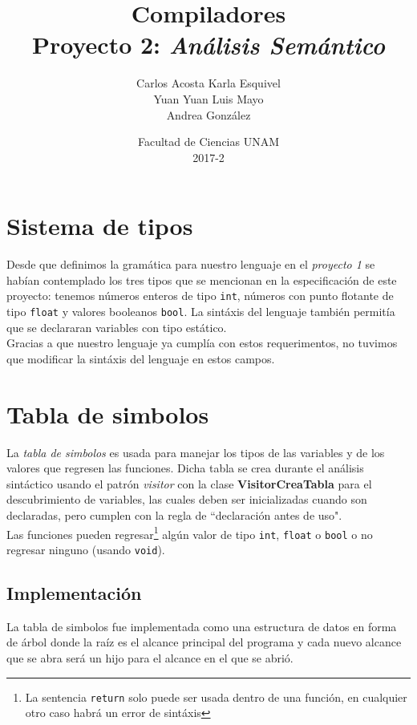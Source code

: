 \documentclass[12pt]{article}
\title{Compiladores\\ Proyecto 2: \emph{Análisis Semántico}}
\author{Carlos Acosta \qquad Karla Esquivel \\ Yuan Yuan \qquad Luis Mayo \\ Andrea González}
\date{Facultad de Ciencias UNAM \\ 2017-2}
\begin{document}
\maketitle
\tableofcontents
\newpage

\section{Sistema de tipos}
Desde que definimos la gramática para nuestro lenguaje en el \emph{proyecto 1} se habían contemplado los tres tipos que se mencionan en la especificación de este proyecto: tenemos números enteros de tipo \texttt{int}, números con punto flotante de tipo \texttt{float} y valores booleanos \texttt{bool}.
La sintáxis del lenguaje también permitía que se declararan variables con tipo estático. \\
Gracias a que nuestro lenguaje ya cumplía con estos requerimentos, no tuvimos que modificar la sintáxis del lenguaje en estos campos.

\section{Tabla de simbolos}
La \textit{tabla de simbolos} es usada para manejar los tipos de las variables y de los valores que regresen las funciones. Dicha tabla se crea durante el análisis sintáctico usando el patrón \textit{visitor} con la clase \textbf{VisitorCreaTabla} para el descubrimiento de variables, las cuales deben ser inicializadas cuando son declaradas, pero cumplen con la regla de ``declaración antes de uso". \\
Las funciones pueden regresar\footnote{La sentencia \texttt{return} solo puede ser usada dentro de una función, en cualquier otro caso habrá un error de sintáxis} algún valor de tipo \texttt{int}, \texttt{float} o \texttt{bool} o no regresar ninguno (usando \texttt{void}).
\subsection{Implementación}
La tabla de simbolos fue implementada como una estructura de datos en forma de árbol donde la raíz es el alcance principal del programa y cada nuevo alcance que se abra será un hijo para el alcance en el que se abrió.
\end{document}
